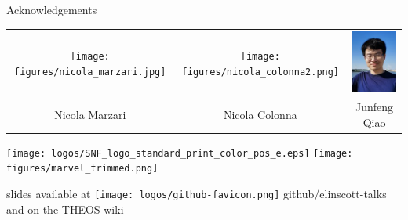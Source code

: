 \documentclass[xcolor=table,aspectratio=169]{beamer}
\numberwithin{equation}{section}
\newcommand{\insertframeinfo}{\insertframenumber}
\newcommand{\backupbegin}{
   \newcounter{finalframe}
   \setcounter{finalframe}{\value{framenumber}}
   \renewcommand{\insertframeinfo}{}
}
\newcommand{\backupend}{
   \setcounter{framenumber}{\value{finalframe}}
}
\begin{document}
\begingroup
{}
\begin{frame}{Acknowledgements}
   \begin{center}
      \footnotesize
      \begin{tabularx}{0.7\textwidth}{CCC}
         \texttt{[image: figures/nicola\_marzari.jpg]}  &
         \texttt{[image: figures/nicola\_colonna2.png]} &
         \includegraphics[height = 0.3\paperheight]{photos/junfeng.jpeg} \\

         Nicola Marzari                                                          &
         Nicola Colonna                                                          &
         Junfeng Qiao
      \end{tabularx}
   \end{center}

   \vspace{2ex}

   \begin{center}
      \texttt{[image: logos/SNF\_logo\_standard\_print\_color\_pos\_e.eps]}
      \hspace{3em}
      \texttt{[image: figures/marvel\_trimmed.png]}
   \end{center}

   \vspace{1ex}

   \begin{center}
      slides available at \texttt{[image: logos/github-favicon.png]} github/elinscott-talks and on the THEOS wiki
   \end{center}

   \vspace{2ex}
   \scriptsize


   \vspace{2ex}
   \scriptsize
\end{frame}
\endgroup
% 
% 
% 
% 
% 
\end{document}
